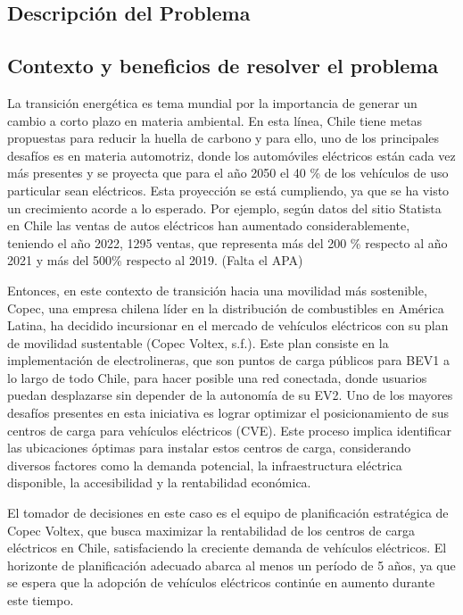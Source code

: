 \documentclass[letterpaper]{article}
\begin{document}
	\newpage
	\begin{flushleft}
		
		\section{Descripción del Problema}
		\subsection{Contexto y beneficios de resolver el problema}
		La transición energética es tema mundial por la importancia de generar un cambio a corto plazo en materia ambiental. En esta línea, Chile tiene metas propuestas para reducir la huella de carbono y para ello, uno de los principales desafíos es en materia automotriz, donde los automóviles eléctricos están cada vez más presentes y se proyecta que para el año 2050 el 40 \% de los vehículos de uso particular sean eléctricos.
		Esta proyección se está cumpliendo, ya que se ha visto un crecimiento acorde a lo esperado. Por ejemplo, según datos del sitio Statista en Chile las ventas de autos eléctricos han aumentado considerablemente, teniendo el año 2022, 1295 ventas, que representa más del 200 \% respecto al año 2021 y más del 500\% respecto al 2019. (Falta el APA)


		Entonces, en este contexto de transición hacia una movilidad más sostenible, Copec, una empresa chilena líder en la distribución de combustibles en América Latina, ha decidido incursionar en el mercado de vehículos eléctricos con su plan de movilidad sustentable (Copec Voltex, s.f.). Este plan consiste en la implementación de electrolineras, que son puntos de carga públicos para BEV1 a lo largo de todo Chile, para hacer posible una red conectada, donde usuarios puedan desplazarse sin depender de la autonomía de su EV2. 
		Uno de los mayores desafíos presentes en esta iniciativa es lograr optimizar el posicionamiento de sus centros de carga para vehículos eléctricos (CVE). Este proceso implica identificar las ubicaciones óptimas para instalar estos centros de carga, considerando diversos factores como la demanda potencial, la infraestructura eléctrica disponible, la accesibilidad y la rentabilidad económica.

		El tomador de decisiones en este caso es el equipo de planificación estratégica de Copec Voltex, que busca maximizar la rentabilidad de los centros de carga eléctricos en Chile, satisfaciendo la creciente demanda de vehículos eléctricos. El horizonte de planificación adecuado abarca al menos un período de 5 años, ya que se espera que la adopción de vehículos eléctricos continúe en aumento durante este tiempo. 


\end{flushleft}
\end{document}
